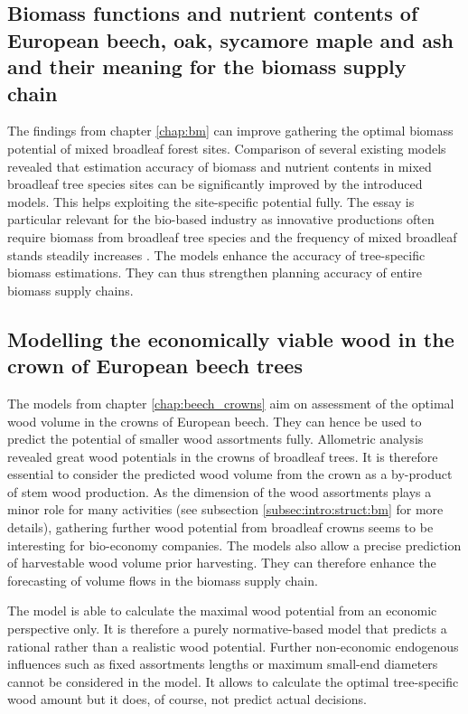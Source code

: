 \subsection{Biomass functions and nutrient contents of European beech, oak, sycamore maple and ash and their meaning for the biomass supply chain}
\label{subsec:discussion:struct:bm}
The findings from chapter \ref{chap:bm} can improve gathering the optimal biomass potential of mixed broadleaf forest sites. Comparison of several existing models revealed that estimation accuracy of biomass and nutrient contents in mixed broadleaf tree species sites can be significantly improved by the introduced models. This helps exploiting the site-specific potential fully. The essay is particular relevant for the bio-based industry as innovative productions often require biomass from broadleaf tree species \citep[p. 1]{auer_2016} and the frequency of mixed broadleaf stands steadily increases \citep{ti_2014}. The models enhance the accuracy of tree-specific biomass estimations. They can thus strengthen planning accuracy of entire biomass supply chains.

\subsection{Modelling the economically viable wood in the crown of European beech trees}
\label{subsec:discussion:struct:beech_crowns}
The models from chapter \ref{chap:beech_crowns} aim on assessment of the optimal wood volume in the crowns of European beech. They can hence be used to predict the potential of smaller wood assortments fully. Allometric analysis revealed great wood potentials in the crowns of broadleaf trees. It is therefore essential to consider the predicted wood volume from the crown as a by-product of stem wood production. As the dimension of the wood assortments plays a minor role for many activities (see subsection \ref{subsec:intro:struct:bm} for more details), gathering further wood potential from broadleaf crowns seems to be interesting for bio-economy companies. The models also allow a precise prediction of harvestable wood volume prior harvesting. They can therefore enhance the forecasting of volume flows in the biomass supply chain.

The model is able to calculate the maximal wood potential from an economic perspective only. It is therefore a purely normative-based model that predicts a rational rather than a realistic wood potential. Further non-economic endogenous influences such as fixed assortments lengths or maximum small-end diameters cannot be considered in the model. It allows to calculate the optimal tree-specific wood amount but it does, of course, not predict actual decisions.

